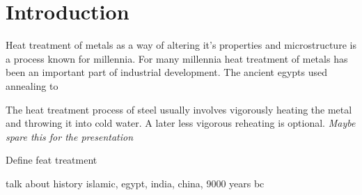 
\chapter{Introduction}
\thispagestyle{fancy}
\label{chap:intro}


Heat treatment of metals as a way of altering it's properties and microstructure is a process known for millennia.  
For many millennia heat treatment of metals has been an important part of industrial development. The ancient egypts used annealing to 


The heat treatment process of steel usually involves vigorously heating the metal and throwing it into cold water. A later less vigorous reheating is optional. \textit{Maybe spare this for the presentation}



Define feat treatment 

talk about history islamic, egypt, india, china, 9000 years bc 

